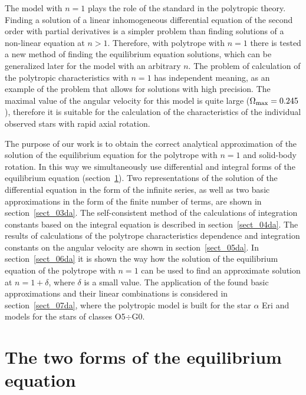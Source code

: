 \documentclass{caosp308}
\begin{document}
The model with $n=1$ plays the role of the standard in the polytropic theory. Finding a solution of a linear inhomogeneous differential equation of the second order with partial derivatives is a simpler problem than finding solutions of a non-linear equation at $n>1$. Therefore, with polytrope with $n=1$ there  is tested a new method of finding the equilibrium equation solutions, which can be generalized later for the model with an arbitrary $n$. The problem of calculation of the polytropic characteristics with $n=1$ has independent meaning, as an example of the problem that allows for solutions with high precision. The maximal value of the angular velocity for this model is quite large ($\Omega_{\rm \max}=0.245$), therefore it is suitable for the calculation of the characteristics of the individual observed stars with rapid axial rotation.

The purpose of our work is to obtain the correct analytical approximation of the solution of the equilibrium equation for the polytrope with $n=1$ and solid-body rotation. In this way we simultaneously use differential and integral forms of the equilibrium equation (section~\ref{sect_02da}). Two representations of the solution of the differential equation in the form of the infinite series, as well as two basic approximations in the form of the finite number of terms, are shown in section~\ref{sect_03da}. The self-consistent method of the calculations of integration constants based on the integral equation is described in section~\ref{sect_04da}. The results of calculations of the polytrope characteristics dependence and integration constants on the angular velocity are shown in section~\ref{sect_05da}. In section~\ref{sect_06da} it is shown the way how the solution of the equilibrium equation of the polytrope with $n=1$ can be used to find an approximate solution at $n=1+\delta$, where $\delta$ is a small value. The application of the found basic approximations and their linear combinations is considered in section~\ref{sect_07da}, where the polytropic model is built for the star $\alpha$ Eri and models for the stars of classes O5$\div$G0.


\section{The two forms of the equilibrium equation}
\label{sect_02da}
\end{document}
